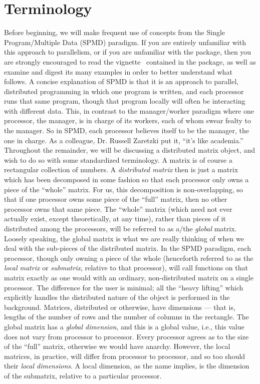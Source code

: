 \section{Terminology}
Before beginning, we will make frequent use of concepts from the Single Program/Multiple Data (SPMD) paradigm.  If you are entirely unfamiliar with this approach to parallelism, or if you are unfamiliar with the  package, then you are strongly encouraged to read the vignette~\citep{Chen2012pbdMPIvignette} contained in the  package, as well as examine and digest its many examples in order to better understand what follows.
\np
A concise explanation of SPMD is that it is an approach to parallel, distributed programming in which one program is written, and each processor runs that same program, though that program locally will often be interacting with different data.  This, in contrast to the manager/worker paradigm where one processor, the manager, is in charge of its workers, each of whom swear fealty to the manager.  So in SPMD, each processor believes itself to be the manager, the one in charge.  As a colleague, Dr. Russell Zaretzki put it, ``it's like academia.''
\np
Throughout the remainder, we will be discussing a distributed matrix object, and wish to do so with some standardized terminology.  A matrix is of course a rectangular collection of numbers.  A \emph{distributed matrix} then is just a matrix which has been decomposed in some fashion so that each processor only owns a piece of the ``whole'' matrix.  For us, this decomposition is non-overlapping, so that if one processor owns some piece of the ``full'' matrix, then no other processor owns that same piece.  The ``whole'' matrix (which need not ever actually exist, except theoretically, at any time), rather than pieces of it distributed among the processors, will be referred to as a/the \emph{global} matrix.  Loosely speaking, the global matrix is what we are really thinking of when we deal with the sub-pieces of the distributed matrix.  
\np
In the SPMD paradigm, each processor, though only owning a piece of the whole (henceforth referred to as the \emph{local matrix} or \emph{submatrix}, relative to that processor), will call functions on that matrix exactly as one would with an ordinary, non-distributed matrix on a single processor.  The difference for the user is minimal; all the ``heavy lifting'' which explicitly handles the distributed nature of the object is performed in the background.
\np
Matrices, distributed or otherwise, have dimensions --- that is, lengths of the number of rows and the number of columns in the rectangle.  The global matrix has a \emph{global dimension}, and this is a global value, i.e., this value does not vary from processor to processor.  Every processor agrees as to the size of the ``full'' matrix, otherwise we would have anarchy.  However, the local matrices, in practice, will differ from processor to processor, and so too should their \emph{local dimensions}.  A local dimension, as the name implies, is the dimension of the submatrix, relative to a particular processor.


